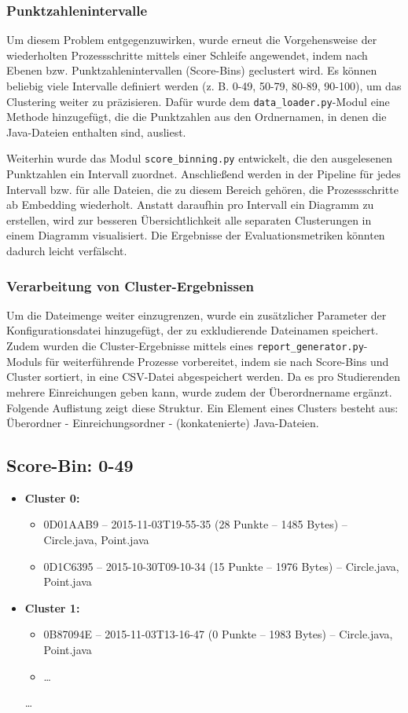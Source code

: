 \subsubsection*{Punktzahlenintervalle}
Um diesem Problem entgegenzuwirken, wurde erneut die Vorgehensweise der wiederholten Prozessschritte mittels einer Schleife angewendet, indem nach Ebenen bzw. Punktzahlenintervallen (Score-Bins) geclustert wird. Es können beliebig viele Intervalle definiert werden (z. B. 0-49, 50-79, 80-89, 90-100), um das Clustering weiter zu präzisieren. Dafür wurde dem \texttt{data\_loader.py}-Modul eine Methode hinzugefügt, die die Punktzahlen aus den Ordnernamen, in denen die Java-Dateien enthalten sind, ausliest.

Weiterhin wurde das Modul \texttt{score\_binning.py} entwickelt, die den ausgelesenen Punktzahlen ein Intervall zuordnet. Anschließend werden in der Pipeline für jedes Intervall bzw. für alle Dateien, die zu diesem Bereich gehören, die Prozessschritte ab Embedding wiederholt. Anstatt daraufhin pro Intervall ein Diagramm zu erstellen, wird zur besseren Übersichtlichkeit alle separaten Clusterungen in einem Diagramm visualisiert. Die Ergebnisse der Evaluationsmetriken könnten dadurch leicht verfälscht.


\subsubsection*{Verarbeitung von Cluster-Ergebnissen}
Um die Dateimenge weiter einzugrenzen, wurde ein zusätzlicher Parameter der Konfigurationsdatei hinzugefügt, der zu exkludierende Dateinamen speichert. Zudem wurden die Cluster-Ergebnisse mittels eines \texttt{report\_generator.py}-Moduls für weiterführende Prozesse vorbereitet, indem sie nach Score-Bins und Cluster sortiert, in eine CSV-Datei abgespeichert werden. Da es pro Studierenden mehrere Einreichungen geben kann, wurde zudem der Überordnername ergänzt. Folgende Auflistung zeigt diese Struktur. Ein Element eines Clusters besteht aus: Überordner - Einreichungsordner - (konkatenierte) Java-Dateien.

\subsection*{Score-Bin: 0-49}
\begin{itemize}
  \item \textbf{Cluster 0:}
  \begin{itemize}
    \item 0D01AAB9 -- 2015-11-03T19-55-35 (28 Punkte -- 1485 Bytes) -- Circle.java, Point.java
    \item 0D1C6395 -- 2015-10-30T09-10-34 (15 Punkte -- 1976 Bytes) -- Circle.java, Point.java
  \end{itemize}
  \item \textbf{Cluster 1:}
  \begin{itemize}
    \item 0B87094E -- 2015-11-03T13-16-47 (0 Punkte -- 1983 Bytes) -- Circle.java, Point.java
    \item \dots
  \end{itemize}
  \dots
\end{itemize}

